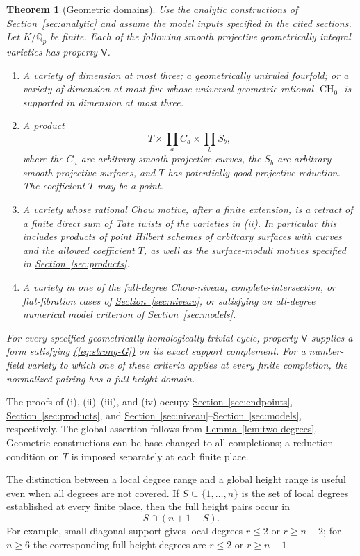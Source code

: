 \documentclass[11pt,a4paper]{article}
\newtheorem{theorem}{Theorem}[section]
\theoremstyle{definition}
\theoremstyle{remark}\newtheorem{remark}[theorem]{Remark}
\numberwithin{equation}{section}
\newcommand{\Q}{\mathbb Q}\newcommand{\R}{\mathbb R}\newcommand{\C}{\mathbb C}
\newcommand{\CH}{\operatorname{CH}}\newcommand{\an}{\mathrm{an}}
\newcommand{\secref}[1]{\hyperref[#1]{\textcolor{sectionlink}{Section~\ref*{#1}}}}
\newcommand{\lemref}[1]{\hyperref[#1]{\textcolor{resultlink}{Lemma~\ref*{#1}}}}
\renewcommand{\eqref}[1]{\hyperref[#1]{\textcolor{equationlink}{(\ref*{#1})}}}
\begin{document}
\begin{theorem}[Geometric domains]\label{thm:geometric-domains}
Use the analytic constructions of \secref{sec:analytic} and assume the model
inputs specified in the cited sections.
Let $K/\Q_p$ be finite. Each of the following smooth projective
geometrically integral varieties has property $\mathsf V$.
\begin{enumerate}[label=\textup{(\roman*)}]
\item A variety of dimension at most three; a geometrically uniruled
fourfold; or a variety of dimension at most five whose universal
geometric rational $\CH_0$ is supported in dimension at most three.
\item A product
\[
 T\times\prod_a C_a\times\prod_b S_b,
\]
where the $C_a$ are arbitrary smooth projective curves, the $S_b$ are
arbitrary smooth projective surfaces, and $T$ has potentially good
projective reduction. The coefficient $T$ may be a point.
\item A variety whose rational Chow motive, after a finite extension,
is a retract of a finite direct sum of Tate twists of the varieties in
\textup{(ii)}. In particular this includes products of point Hilbert
schemes of arbitrary surfaces with curves and the allowed coefficient
$T$, as well as the surface-moduli motives specified in
\secref{sec:products}.
\item A variety in one of the full-degree Chow-niveau, complete-intersection,
or flat-fibration cases of \secref{sec:niveau}, or satisfying an
all-degree numerical model criterion of \secref{sec:models}.
\end{enumerate}
For every specified geometrically homologically trivial cycle, property
$\mathsf V$ supplies a form satisfying \eqref{eq:strong-G} on its exact
support complement. For a number-field variety to which one of these
criteria applies at every finite completion, the normalized pairing has
a full height domain.
\end{theorem}

The proofs of (i), (ii)--(iii), and (iv) occupy
\secref{sec:endpoints}, \secref{sec:products}, and
\secref{sec:niveau}--\secref{sec:models}, respectively. The global
assertion follows from \lemref{lem:two-degrees}. Geometric constructions
can be base changed to all completions; a reduction condition on $T$ is
imposed separately at each finite place.

The distinction between a local degree range and a global height range
is useful even when all degrees are not covered. If $S\subseteq
\{1,\ldots,n\}$ is the set of local degrees established at every finite
place, then the full height pairs occur in
\begin{equation}\label{eq:range-intersection}
 S\cap(n+1-S).
\end{equation}
For example, small diagonal support gives local degrees $r\leq2$ or
$r\geq n-2$; for $n\geq6$ the corresponding full height degrees are
$r\leq2$ or $r\geq n-1$.
\end{document}
